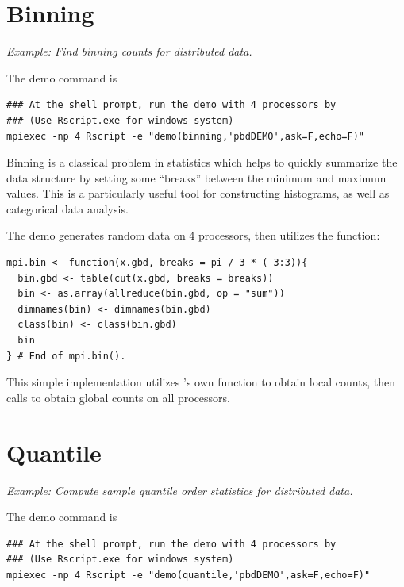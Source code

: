 \section[Binning]{Binning}%
\label{sec:binning}

\emph{Example:  Find binning counts for distributed data.}

The demo command is
\begin{lstlisting}
### At the shell prompt, run the demo with 4 processors by
### (Use Rscript.exe for windows system)
mpiexec -np 4 Rscript -e "demo(binning,'pbdDEMO',ask=F,echo=F)"
\end{lstlisting}

Binning is a classical problem in statistics which helps to quickly summarize
the data structure by setting some ``breaks'' between the minimum and maximum
values.
This is a particularly useful tool for constructing histograms, as well as
categorical data analysis.

The demo generates random data on 4 processors, then
utilizes the  function:
\begin{lstlisting}[language=rr,title=R Code]
mpi.bin <- function(x.gbd, breaks = pi / 3 * (-3:3)){
  bin.gbd <- table(cut(x.gbd, breaks = breaks))
  bin <- as.array(allreduce(bin.gbd, op = "sum"))
  dimnames(bin) <- dimnames(bin.gbd)
  class(bin) <- class(bin.gbd)
  bin
} # End of mpi.bin().
\end{lstlisting}
This simple implementation utilizes 's own 
function to obtain local counts, then calls
to obtain global counts on all processors.






\section[Quantile]{Quantile}%
\label{sec:quantile}

\emph{Example:  Compute sample quantile order statistics for distributed data.}

The demo command is
\begin{lstlisting}
### At the shell prompt, run the demo with 4 processors by
### (Use Rscript.exe for windows system)
mpiexec -np 4 Rscript -e "demo(quantile,'pbdDEMO',ask=F,echo=F)"
\end{lstlisting}

